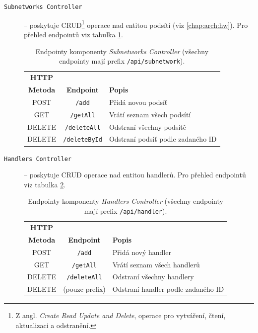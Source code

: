\begin{description}
    \item[\texttt{Subnetworks Controller}] -- poskytuje CRUD\footnote{Z angl. \textit{Create Read Update and Delete}, operace pro vytváření, čtení, aktualizaci a odstranění.} operace nad entitou podsítí (viz \ref{chap:arch:hw}). Pro přehled endpointů viz tabulka \ref{tab:master:api_subnetworks}.

    \begin{table}[h!]
        \begin{center}
            \begin{tabular}{|c|c|l|}
                \hline
          \textbf{HTTP} & & \\
          \textbf{Metoda} & \textbf{Endpoint} & \textbf{Popis} \\
            \hline
            POST & \texttt{/add} & Přidá novou podsíť \\
            GET & \texttt{/getAll} & Vrátí seznam všech podsítí \\
            DELETE & \texttt{/deleteAll} & Odstraní všechny podsítě \\
            DELETE & \texttt{/deleteById} & Odstraní podsíť podle zadaného ID \\
            \hline
            \end{tabular}
        \end{center}
        \caption{Endpointy komponenty \textit{Subnetworks Controller} (všechny endpointy mají prefix \texttt{/api/subnetwork}).}
        \label{tab:master:api_subnetworks}
    \end{table}

    \item[\texttt{Handlers Controller}] -- poskytuje CRUD operace nad entitou handlerů. Pro přehled endpointů viz tabulka \ref{tab:master:api_handlers}.

    \begin{table}[h!]
        \begin{center}
            \begin{tabular}{|c|c|l|}
                \hline
          \textbf{HTTP} & & \\
          \textbf{Metoda} & \textbf{Endpoint} & \textbf{Popis} \\
            \hline
            POST & \texttt{/add} & Přidá nový handler \\
            GET & \texttt{/getAll} & Vrátí seznam všech handlerů \\
            DELETE & \texttt{/deleteAll} & Odstraní všechny handlery \\
            DELETE & (pouze prefix) & Odstraní handler podle zadaného ID \\
            \hline
            \end{tabular}
        \end{center}
        \caption{Endpointy komponenty \textit{Handlers Controller} (všechny endpointy mají prefix \texttt{/api/handler}).}
        \label{tab:master:api_handlers}
    \end{table}


\end{description}
